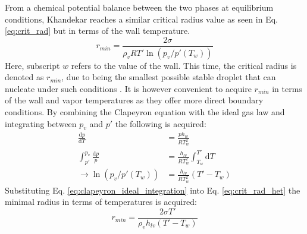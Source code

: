 \documentclass[12pt]{article}
\numberwithin{equation}{section}
\begin{document}
From a chemical potential balance between the two phases at equilibrium conditions, Khandekar reaches a similar critical radius value as seen in Eq. \ref{eq:crit_rad} but in terms of the wall temperature.
\begin{equation}\label{eq:crit_rad_het}
    r_{min}=\frac{2\sigma}{\rho_{v} RT'\ln(p_{v}/p'(T_{w}))}
\end{equation}
Here, subscript $w$ refers to the value of the wall. This time, the critical radius is denoted as $r_{min}$, due to being the smallest possible stable droplet that can nucleate under such conditions \cite{khandekar2020drop}. It is however convenient to acquire $r_{min}$ in terms of the wall and vapor temperatures as they offer more direct boundary conditions. By combining the Clapeyron equation  with the ideal gas law and integrating between $p_{v}$ and $p'$ the following is acquired:
\begin{equation}
    \begin{aligned}
        \frac{\mathrm{d}p}{\mathrm{d}T}&=\frac{ph_{lv}}{RT_{w}^{2}} \\
        \int_{p'}^{p_{v}}\frac{\mathrm{d}p}{p}&=\frac{h_{lv}}{RT_{w}^{2}} \int_{T_{w}}^{T'}\mathrm{d}T\\
        \rightarrow\ln(p_{v}/p'(T_{w}))&=\frac{h_{lv}}{RT_{w}^{2}}(T'-T_{w})       
    \end{aligned}\label{eq:clapeyron_ideal_integration}
\end{equation}
Substituting Eq. \ref{eq:clapeyron_ideal_integration} into Eq. \ref{eq:crit_rad_het} the minimal radius in terms of temperatures is acquired:
\begin{equation}\label{eq:r_min_temp}
    r_{min}=\frac{2\sigma T'}{\rho_{v} h_{lv}(T'-T_{w})}
\end{equation}
\end{document}
